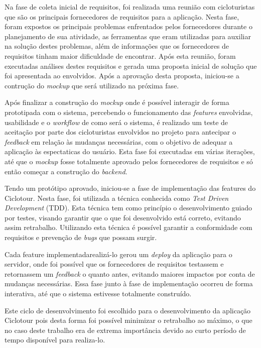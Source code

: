 Na fase de coleta inicial de requisitos, foi realizada uma reunião com cicloturistas que são os principais fornecedores de requisitos para a 
aplicação. Nesta fase, foram expostos os principais problemas enfrentados pelos fornecedores durante o planejamento de sua atividade, as 
ferramentas que eram utilizadas para auxiliar na solução destes problemas, além de informações que os fornecedores de requisitos tinham maior
dificuldade de encontrar. Após esta reunião, foram executadas análises destes requisitos e gerada uma proposta inicial de solução que foi apresentada
ao envolvidos. Após a aprovação desta proposta, iniciou-se a contrução do \textit{mockup} que será utilizado na próxima fase.

Após finalizar a construção do \textit{mockup} onde é possível interagir de forma prototipada com o sistema, percebendo o funcionamento das 
\textit{features} envolvidas, usabilidade e o \textit{workflow} de como será o sistema, é realizado um teste de aceitação por parte dos 
cicloturistas envolvidos no projeto para antecipar o \textit{feedback} em relação às mudanças necessárias, com o objetivo de adequar a aplicação às 
espectaticas do usuário. Esta fase foi executadas em várias iterações, até que o \textit{mockup} fosse totalmente aprovado pelos fornecedores de 
requisitos e só então começar a construção do \textit{backend}.

Tendo um protótipo aprovado, iniciou-se a fase de implementação das features do Ciclotour. Nesta fase, foi utilizada a técnica conhecida como 
\textit{Test Driven Development} (TDD). Esta técnica tem como princípio o desenvolvimento guiado por testes, visando garantir que o que foi 
desenvolvido está correto, evitando assim retrabalho. Utilizando esta técnica é possível garantir a conformidade com requisitos e prevenção de 
\textit{bugs} que possam surgir. 

Cada feature implementadarealizá-lo gerou um \textit{deploy} da aplicação para o servidor, onde foi possível que os fornecedores de requisitos testassem
e retornassem um \textit{feedback} o quanto antes, evitando maiores impactos por conta de mudanças necessárias. Essa fase junto à fase de 
implementação ocorreu de forma interativa, até que o sistema estivesse totalmente construído.

Este ciclo de desenvolvimento foi escolhido para o desenvolvimento da aplicação Ciclotour pois desta forma foi possível minimizar o retrabalho ao 
máximo, o que no caso deste trabalho era de extrema importância devido ao curto período de tempo disponível para realiza-lo. 

